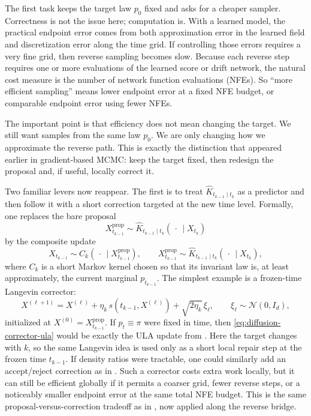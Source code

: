 The first task keeps the target law \(p_0\) fixed and asks for a cheaper sampler.
Correctness is not the issue here; computation is.
With a learned model, the practical endpoint error comes from both approximation error in the learned field and discretization error along the time grid.
If controlling those errors requires a very fine grid, then reverse sampling becomes slow.
Because each reverse step requires one or more evaluations of the learned score or drift network, the natural cost measure is the number of network function evaluations (NFEs).
So ``more efficient sampling'' means lower endpoint error at a fixed NFE budget, or comparable endpoint error using fewer NFEs.

The important point is that efficiency does not mean changing the target.
We still want samples from the same law \(p_0\).
We are only changing how we approximate the reverse path.
This is exactly the distinction that appeared earlier in gradient-based MCMC:
keep the target fixed, then redesign the proposal and, if useful, locally correct it.

Two familiar levers now reappear.
The first is to treat \(\hat K_{t_{k-1}\mid t_k}\) as a predictor and then follow it with a short correction targeted at the new time level.
Formally, one replaces the bare proposal
\[
  X_{t_{k-1}}^{\mathrm{prop}}
  \sim
  \hat K_{t_{k-1}\mid t_k}(\,\cdot\,\mid X_{t_k})
\]
by the composite update
\[
  X_{t_{k-1}}
  \sim
  C_k(\,\cdot\,\mid X_{t_{k-1}}^{\mathrm{prop}}),
  \qquad
  X_{t_{k-1}}^{\mathrm{prop}}
  \sim
  \hat K_{t_{k-1}\mid t_k}(\,\cdot\,\mid X_{t_k}),
\]
where \(C_k\) is a short Markov kernel chosen so that its invariant law is, at least approximately, the current marginal \(p_{t_{k-1}}\).
The simplest example is a frozen-time Langevin corrector:
\begin{equation}
  X^{(\ell+1)}
  =
  X^{(\ell)}
  +
  \eta_k\, s(t_{k-1},X^{(\ell)})
  +
  \sqrt{2\eta_k}\,\xi_\ell,
  \qquad
  \xi_\ell\sim\mathcal{N}(0,I_d),
  \label{eq:diffusion-corrector-ula}
\end{equation}
initialized at \(X^{(0)}=X_{t_{k-1}}^{\mathrm{prop}}\).
If \(p_t\equiv \pi\) were fixed in time, then \eqref{eq:diffusion-corrector-ula} would be exactly the ULA update from .
Here the target changes with \(k\), so the same Langevin idea is used only as a short local repair step at the frozen time \(t_{k-1}\).
If density ratios were tractable, one could similarly add an accept/reject correction as in .
Such a corrector costs extra work locally, but it can still be efficient globally if it permits a coarser grid, fewer reverse steps, or a noticeably smaller endpoint error at the same total NFE budget.
This is the same proposal-versus-correction tradeoff as in , now applied along the reverse bridge.

